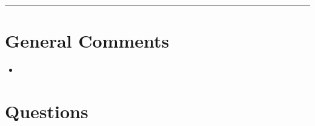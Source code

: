 \documentclass{exam}
\title{}
\date{Markov Chains, Continuous Probability, Conditional Expectation}
\begin{document}
\maketitle
\rule{\textwidth}{0.15em}
\fontsize{12}{15}\selectfont
\thispagestyle{empty}


\section{General Comments}
\begin{itemize}
\item 
\end{itemize}


\section{Questions}
\end{document}
